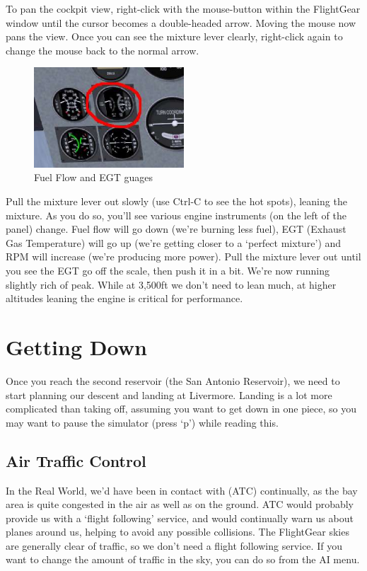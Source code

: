 To pan the cockpit view, right-click with the mouse-button within the FlightGear window until the cursor becomes a double-headed arrow. Moving the mouse now pans the view. Once you can see the mixture lever clearly, right-click again to change the mouse back to the normal arrow.

\begin{figure}[!htp]
\centering
\includegraphics[width=0.5\textwidth]{fuel_flow}
\caption{Fuel Flow and EGT guages\label{egt}}
\end{figure}

Pull the mixture lever out slowly (use Ctrl-C to see the hot spots), leaning the mixture. As you do so, you'll see various engine instruments (on the left of the panel) change. Fuel flow will go down (we're burning less fuel), EGT (Exhaust Gas Temperature) will go up (we're getting closer to a `perfect mixture') and RPM will increase (we're producing more power). Pull the mixture lever out until you see the EGT go off the scale, then push it in a bit. We're now running slightly rich of peak. While at 3,500ft we don't need to lean much, at higher altitudes leaning the engine is critical for performance.

\section{Getting Down}

Once you reach the second reservoir (the San Antonio Reservoir), we need to start planning our descent and landing at Livermore. Landing is a lot more complicated than taking off, assuming you want to get down in one piece, so you may want to pause the simulator (press `p') while reading this.

\subsection{Air Traffic Control}

In the Real World, we'd have been in contact with  (ATC) continually, as the bay area is quite congested in the air as well as on the ground. ATC would probably provide us with a `flight following' service, and would continually warn us about planes around us, helping to avoid any possible collisions. The FlightGear skies are generally clear of traffic, so we don't need a flight following service. If you want to change the amount of traffic in the sky, you can do so from the AI menu.

